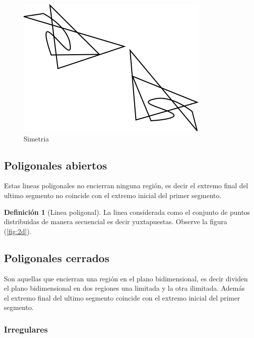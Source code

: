 \documentclass[
  16pt,
]{krantz}
\theoremstyle{definition}
\newtheorem{definition}{Definición}[chapter]
\theoremstyle{definition}
\theoremstyle{definition}
\theoremstyle{definition}
\theoremstyle{remark}
\begin{document}
\begin{figure}[!ht]

{\centering \includegraphics{simetria} 

}

\caption{Simetria}\label{fig:simetria}
\end{figure}

\hypertarget{poligonales-abiertos}{%
\subsection{Poligonales abiertos}\label{poligonales-abiertos}}

Estas lineas poligonales no encierran ninguna región, es decir el extremo final del ultimo segmento no coincide con el extremo inicial del primer segmento.

\begin{definition}[Linea poligonal]
\protect\hypertarget{def:poligono}{}{\label{def:poligono} {} }La linea considerada como el conjunto de puntos distribuidas de manera secuencial es decir yuxtapuestas. Observe la figura (\ref{fig:2d}).
\end{definition}

\hypertarget{poligonales-cerrados}{%
\subsection{Poligonales cerrados}\label{poligonales-cerrados}}

Son aquellas que encierran una región en el plano bidimensional, es decir dividen el plano bidimensional en dos regiones una limitada y la otra ilimitada. Además el extremo final del ultimo segmento coincide con el extremo inicial del primer segmento.

\hypertarget{irregulares}{%
\subsubsection{Irregulares}\label{irregulares}}
\end{document}
